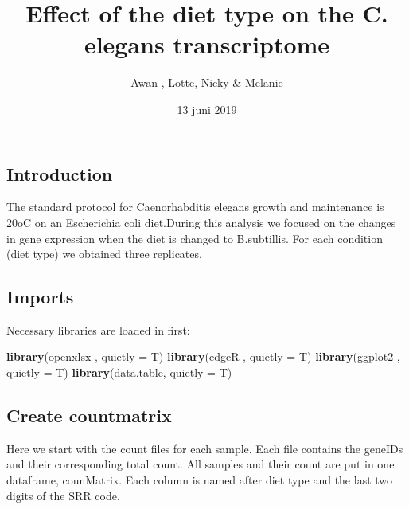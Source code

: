 \documentclass[]{article}
\title{Effect of the diet type on the C. elegans transcriptome}
\author{Awan , Lotte, Nicky \& Melanie}
\date{13 juni 2019}
\newenvironment{Shaded}{\begin{snugshade}}{\end{snugshade}}
\newcommand{\KeywordTok}[1]{\textcolor[rgb]{0.13,0.29,0.53}{\textbf{#1}}}
\newcommand{\DataTypeTok}[1]{\textcolor[rgb]{0.13,0.29,0.53}{#1}}
\newcommand{\NormalTok}[1]{#1}
\begin{document}
\maketitle

\subsection{Introduction}\label{introduction}

The standard protocol for Caenorhabditis elegans growth and maintenance
is 20oC on an Escherichia coli diet.During this analysis we focused on
the changes in gene expression when the diet is changed to B.subtillis.
For each condition (diet type) we obtained three replicates.

\subsection{Imports}\label{imports}

Necessary libraries are loaded in first:

\begin{Shaded}
\begin{Highlighting}[]
\KeywordTok{library}\NormalTok{(openxlsx  , }\DataTypeTok{quietly =}\NormalTok{ T)}
\KeywordTok{library}\NormalTok{(edgeR     , }\DataTypeTok{quietly =}\NormalTok{ T)}
\KeywordTok{library}\NormalTok{(ggplot2   , }\DataTypeTok{quietly =}\NormalTok{ T)}
\KeywordTok{library}\NormalTok{(data.table, }\DataTypeTok{quietly =}\NormalTok{ T)}
\end{Highlighting}
\end{Shaded}

\subsection{Create countmatrix}\label{create-countmatrix}

Here we start with the count files for each sample. Each file contains
the geneIDs and their corresponding total count. All samples and their
count are put in one dataframe, counMatrix. Each column is named after
diet type and the last two digits of the SRR code.
\end{document}
